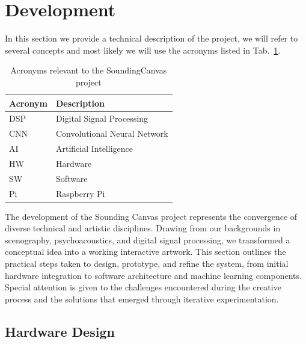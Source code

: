 \documentclass{article}
\begin{document}
\section{Development}
In this section we provide a technical description of the project, we will refer to several concepts and most likely we will use the acronyms listed in Tab.~\ref{table:Acronyms}.
\begin{table}[h]
	\centering
	\begin{tabularx}{\textwidth} { 
			| >{\centering\arraybackslash}X
			| >{\centering\arraybackslash}X | }
		\hline
		\rowcolor{Gray}
		\textbf{Acronym} & \textbf{Description}\\
		\hline
		DSP & Digital Signal Processing \\
		\hline
		CNN & Convolutional Neural Network \\
		\hline
		AI & Artificial Intelligence \\
		\hline
		HW & Hardware \\
		\hline
		SW & Software \\
		\hline
		Pi & Raspberry Pi \\
		\hline
	\end{tabularx}
	\caption{Acronyms relevant to the SoundingCanvas project}
	\label{table:Acronyms}
\end{table}
The development of the Sounding Canvas project represents the convergence of diverse technical and artistic disciplines. Drawing from our backgrounds in scenography, psychoacoustics, and digital signal processing, we transformed a conceptual idea into a working interactive artwork. This section outlines the practical steps taken to design, prototype, and refine the system, from initial hardware integration to software architecture and machine learning components. Special attention is given to the challenges encountered during the creative process and the solutions that emerged through iterative experimentation.

\subsection{Hardware Design}
\end{document}
